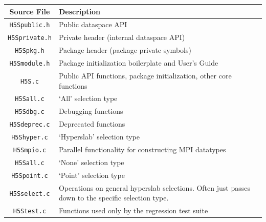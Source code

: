 \begin{table}[!ht]
\begin{tabular}{||c|l||}
\hline
\textbf{Source File} & \textbf{Description} \\  [0.5ex]
\hline\hline
\texttt{H5Spublic.h} & Public dataspace API \\
\texttt{H5Sprivate.h} & Private header (internal dataspace API) \\
\texttt{H5Spkg.h} & Package header (package private symbols) \\
\texttt{H5Smodule.h} & Package initialization boilerplate and User's Guide \\
\texttt{H5S.c} & Public API functions, package initialization, other core functions \\
\texttt{H5Sall.c} & `All' selection type \\
\texttt{H5Sdbg.c} & Debugging functions \\
\texttt{H5Sdeprec.c} & Deprecated functions \\
\texttt{H5Shyper.c} & `Hyperslab' selection type \\
\texttt{H5Smpio.c} & Parallel functionality for constructing MPI datatypes \\
\texttt{H5Sall.c} & `None' selection type \\
\texttt{H5Spoint.c} & `Point' selection type \\
\texttt{H5Sselect.c} & Operations on general hyperslab selections. Often just passes down to the specific selection type. \\
\texttt{H5Stest.c} & Functions used only by the regression test suite \\
\hline
\end{tabular}
\label{table:H5Scode}
\end{table}



